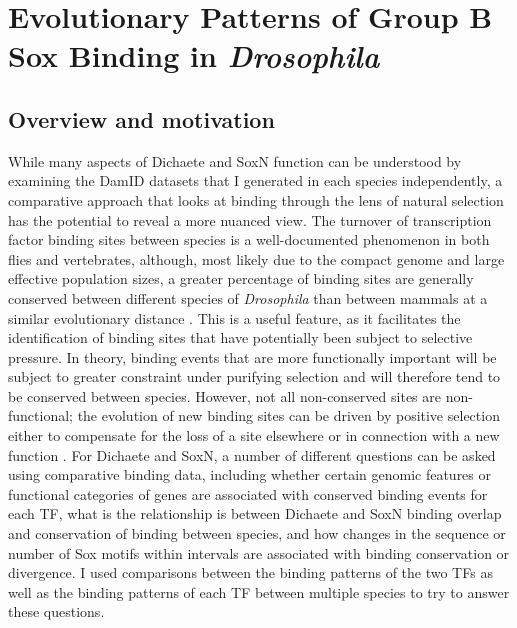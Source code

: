 \chapter{Evolutionary Patterns of Group B Sox Binding in \emph{Drosophila}}

\hrulefill

\section{Overview and motivation}

While many aspects of Dichaete and SoxN function can be understood by examining the DamID datasets that I generated in each species independently, a comparative approach that looks at binding through the lens of natural selection has the potential to reveal a more nuanced view. The turnover of transcription factor binding sites between species is a well-documented phenomenon in both flies and vertebrates, although, most likely due to the compact genome and large effective population sizes, a greater percentage of binding sites are generally conserved between different species of \emph{Drosophila} than between mammals at a similar evolutionary distance \citep{bradley_binding_2010,he_high_2011,ludwig_evidence_2000,ludwig_functional_2002,odom_tissue-specific_2007,schmidt_five-vertebrate_2010,stefflova_cooperativity_2013,villar_evolution_2014,wratten_evolutionary_2006}. This is a useful feature, as it facilitates the identification of binding sites that have potentially been subject to selective pressure. In theory, binding events that are more functionally important will be subject to greater constraint under purifying selection and will therefore tend to be conserved between species. However, not all non-conserved sites are non-functional; the evolution of new binding sites can be driven by positive selection either to compensate for the loss of a site elsewhere or in connection with a new function \citep{arnoult_emergence_2013,frankel_conserved_2012,he_does_2011,kalay_nomadic_2010}. For Dichaete and SoxN, a number of different questions can be asked using comparative binding data, including whether certain genomic features or functional categories of genes are associated with conserved binding events for each TF, what is the relationship is between Dichaete and SoxN binding overlap and conservation of binding between species, and how changes in the sequence or number of Sox motifs within intervals are associated with binding conservation or divergence. I used comparisons between the binding patterns of the two TFs as well as the binding patterns of each TF between multiple species to try to answer these questions.

